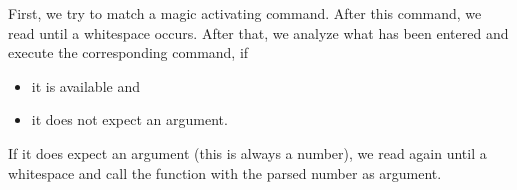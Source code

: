 \documentclass[10pt, letterpaper]{article}
\begin{document}
First, we try to match a magic activating command. After this command, we read until a whitespace occurs. After that, we analyze what has been entered and execute the corresponding command, if 
\begin{itemize}
 \item it is available and
 \item it does not expect an argument.
\end{itemize}

If it does expect an argument (this is always a number), we read again until a whitespace and call the function with the parsed number as argument.
\end{document}

